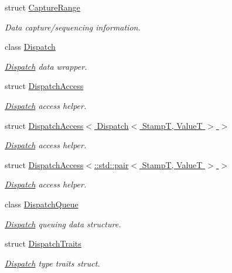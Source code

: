 \begin{DoxyCompactItemize}
struct \hyperlink{structflow_1_1_capture_range}{Capture\+Range}
\begin{DoxyCompactList}\small\item\em Data capture/sequencing information. \end{DoxyCompactList}\item 
class \hyperlink{classflow_1_1_dispatch}{Dispatch}
\begin{DoxyCompactList}\small\item\em \hyperlink{classflow_1_1_dispatch}{Dispatch} data wrapper. \end{DoxyCompactList}\item 
struct \hyperlink{structflow_1_1_dispatch_access}{Dispatch\+Access}
\begin{DoxyCompactList}\small\item\em \hyperlink{classflow_1_1_dispatch}{Dispatch} access helper. \end{DoxyCompactList}\item 
struct \hyperlink{structflow_1_1_dispatch_access_3_01_dispatch_3_01_stamp_t_00_01_value_t_01_4_01_4}{Dispatch\+Access$<$ Dispatch$<$ Stamp\+T, Value\+T $>$ $>$}
\begin{DoxyCompactList}\small\item\em \hyperlink{classflow_1_1_dispatch}{Dispatch} access helper. \end{DoxyCompactList}\item 
struct \hyperlink{structflow_1_1_dispatch_access_3_1_1std_1_1pair_3_01_stamp_t_00_01_value_t_01_4_01_4}{Dispatch\+Access$<$\+::std\+::pair$<$ Stamp\+T, Value\+T $>$ $>$}
\begin{DoxyCompactList}\small\item\em \hyperlink{classflow_1_1_dispatch}{Dispatch} access helper. \end{DoxyCompactList}\item 
class \hyperlink{classflow_1_1_dispatch_queue}{Dispatch\+Queue}
\begin{DoxyCompactList}\small\item\em \hyperlink{classflow_1_1_dispatch}{Dispatch} queuing data structure. \end{DoxyCompactList}\item 
struct \hyperlink{structflow_1_1_dispatch_traits}{Dispatch\+Traits}
\begin{DoxyCompactList}\small\item\em \hyperlink{classflow_1_1_dispatch}{Dispatch} type traits struct. \end{DoxyCompactList}\item 

\end{DoxyCompactItemize}
